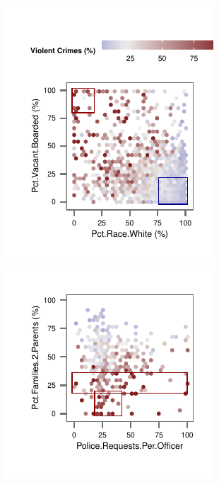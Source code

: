 \begin{figure}[t!]
    \centering
    \begin{subfigure}[b]{0.42\columnwidth}
    \includegraphics[width=\textwidth]{plots/crime1}
    \end{subfigure}
    \begin{subfigure}[b]{0.42\columnwidth}
    \includegraphics[width=\textwidth]{plots/crime2}
    \end{subfigure}


\end{figure}
